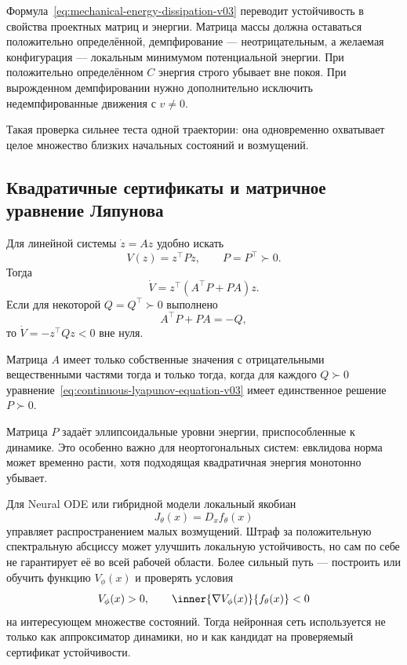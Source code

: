 \begin{application}
Формула~\eqref{eq:mechanical-energy-dissipation-v03} переводит устойчивость в свойства проектных матриц и энергии. Матрица массы должна оставаться положительно определённой, демпфирование --- неотрицательным, а желаемая конфигурация --- локальным минимумом потенциальной энергии. При положительно определённом $C$ энергия строго убывает вне покоя. При вырожденном демпфировании нужно дополнительно исключить недемпфированные движения с $v\neq0$.

Такая проверка сильнее теста одной траектории: она одновременно охватывает целое множество близких начальных состояний и возмущений.
\end{application}

\subsection{Квадратичные сертификаты и матричное уравнение Ляпунова}

Для линейной системы $\dot z=Az$ удобно искать
\begin{equation}
\label{eq:quadratic-lyapunov-v03}
V(z)=z^\top Pz,
\qquad
P=P^\top\succ0.
\end{equation}
Тогда
\begin{equation}
\label{eq:quadratic-lyapunov-derivative-v03}
\dot V
=
z^\top(A^\top P+PA)z.
\end{equation}
Если для некоторой $Q=Q^\top\succ0$ выполнено
\begin{equation}
\label{eq:continuous-lyapunov-equation-v03}
A^\top P+PA=-Q,
\end{equation}
то $\dot V=-z^\top Qz<0$ вне нуля.

\begin{theorem}
\label{thm:quadratic-lyapunov-criterion-v03}
Матрица $A$ имеет только собственные значения с отрицательными вещественными частями тогда и только тогда, когда для каждого $Q\succ0$ уравнение~\eqref{eq:continuous-lyapunov-equation-v03} имеет единственное решение $P\succ0$.
\end{theorem}

Матрица $P$ задаёт эллипсоидальные уровни энергии, приспособленные к динамике. Это особенно важно для неортогональных систем: евклидова норма может временно расти, хотя подходящая квадратичная энергия монотонно убывает.

\begin{mlconnection}
Для Neural ODE или гибридной модели локальный якобиан
\[
J_\theta(x)=D_xf_\theta(x)
\]
управляет распространением малых возмущений. Штраф за положительную спектральную абсциссу может улучшить локальную устойчивость, но сам по себе не гарантирует её во всей рабочей области. Более сильный путь --- построить или обучить функцию $V_\phi(x)$ и проверять условия
\[
V_\phi(x)>0,
\qquad
\inner{\grad V_\phi(x)}{f_\theta(x)}<0
\]
на интересующем множестве состояний. Тогда нейронная сеть используется не только как аппроксиматор динамики, но и как кандидат на проверяемый сертификат устойчивости.
\end{mlconnection}

